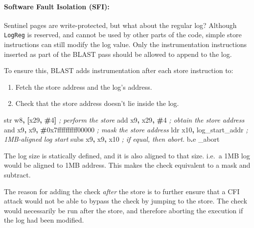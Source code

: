 \documentclass[a4paper, nobind]{templates/ociamthesis}
\providecommand{\tightlist}{%
  \setlength{\itemsep}{0pt}\setlength{\parskip}{0pt}}
\newenvironment{Shaded}{\begin{snugshade}}{\end{snugshade}}
\newcommand{\BaseNTok}[1]{\textcolor[rgb]{0.00,0.00,0.81}{#1}}
\newcommand{\BuiltInTok}[1]{#1}
\newcommand{\CommentTok}[1]{\textcolor[rgb]{0.56,0.35,0.01}{\textit{#1}}}
\newcommand{\DecValTok}[1]{\textcolor[rgb]{0.00,0.00,0.81}{#1}}
\newcommand{\NormalTok}[1]{#1}
\newcommand{\OperatorTok}[1]{\textcolor[rgb]{0.81,0.36,0.00}{\textbf{#1}}}
\renewenvironment{Shaded}
{
  \vspace{10pt}%
  \begin{snugshade}%
}{%
  \end{snugshade}%
  \vspace{8pt}%
}
\begin{document}
\paragraph{Software Fault Isolation (SFI):}\label{blastsfi}

Sentinel pages are write-protected, but what about the regular log?
Although \texttt{LogReg} is reserved, and cannot be used by other parts of the code,
simple store instructions can still modify the log value. Only the instrumentation
instructions inserted as part of the BLAST pass should be allowed to append to the log.

To ensure this, BLAST adds instrumentation after each store instruction to:

\begin{enumerate}
\def\labelenumi{\arabic{enumi}.}
\tightlist
\item
  Fetch the store address and the log's address.
\item
  Check that the store address doesn't lie inside the log.
\end{enumerate}

\begin{Shaded}
\begin{Highlighting}[]
\BuiltInTok{str}\NormalTok{ w8}\OperatorTok{,} \OperatorTok{[}\NormalTok{x29}\OperatorTok{,} \OperatorTok{\#}\DecValTok{4}\OperatorTok{]}                 \CommentTok{; perform the store}
\BuiltInTok{add}\NormalTok{ x9}\OperatorTok{,}\NormalTok{ x29}\OperatorTok{,} \OperatorTok{\#}\DecValTok{4}                   \CommentTok{; obtain the store address}
\BuiltInTok{and}\NormalTok{ x9}\OperatorTok{,}\NormalTok{ x9}\OperatorTok{,} \OperatorTok{\#}\BaseNTok{0x7ffffffffff00000}   \CommentTok{; mask the store address}
\NormalTok{ldr x10}\OperatorTok{,}\NormalTok{ log\_start\_addr           }\CommentTok{; 1MB{-}aligned log start}
\NormalTok{subs x9}\OperatorTok{,}\NormalTok{ x9}\OperatorTok{,}\NormalTok{ x10                  }\CommentTok{; if equal, then abort.}
\NormalTok{b}\OperatorTok{.}\NormalTok{e \_abort}
\end{Highlighting}
\end{Shaded}

The log size is statically defined, and it is also aligned to that size.
i.e.~a 1MB log would be aligned to 1MB address. This makes the check equivalent
to a mask and subtract.

The reason for adding the check \emph{after} the store is to further ensure that a
CFI attack would not be able to bypass the check by jumping to the store.
The check would necessarily be run after the store, and therefore aborting the
execution if the log had been modified.
\end{document}
